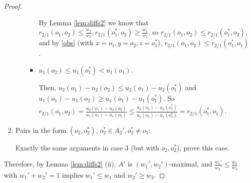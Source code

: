 \documentclass[sigconf]{aamas}
\theoremstyle{definition}
\begin{document}
\begin{proof}
\begin{enumerate}
\begin{enumerate}[(a)]
\begin{itemize}
By Lemma \ref{lem:diffs2} we know that $r_{2/1}(o_1,o_2) \leq \frac{w_1}{w_2}, r_{2/1}(o_1^*,o_2) \geq \frac{w_1}{w_2}$, so $r_{2/1}(o_1,o_2) \leq r_{2/1}(o_1^*,o_2)$, and by \ref{obs} (with $x=o_1,y=o_2,z=o_1^*$), $r_{2/1}(o_1,o_2) \leq r_{2/1}(o_1^*,o_1)$.
\item 
$u_1(o_2)\leq u_1(o_1^*)<u_1(o_1)$.

Then, 
$u_2(o_1)-u_2(o_2) \leq u_2(o_1)-u_2(o_1^*)$
and 
$u_1(o_1)-u_1(o_2) \geq u_1(o_1)-u_1(o_1^*)$.
So
$r_{2/1}(o_1,o_2)
= 
\frac{u_2(o_1)-u_2(o_2)}{u_1(o_1)-u_1(o_2)}
\leq 
\frac{u_2(o_1)-u_2(o_1^*)}{u_1(o_1)-u_1(o_1^*)}
=
r_{2/1}(o_1^*,o_1)$.
\end{itemize}
\end{enumerate}
    
    \item Pairs in the form $(o_2,o_2^*)$, $o_2^*\in A_2', o_2^* \neq o_1$:
    
    Exactly the same arguments in case 3 (but with $o_2,o_2^*$), prove this case.
\end{enumerate}
Therefore, by Lemma \ref{lem:diffs2} (ii), $A'$ is $(w_1',w_2')$-maximal, and  $\frac{w_1'}{w_2'} \leq \frac{w_1}{w_2}$ with $w_1'+w_2'=1$ implies $w_1'\leq w_1$ and $w_2' \geq w_2$.
\end{proof}
\end{document}
